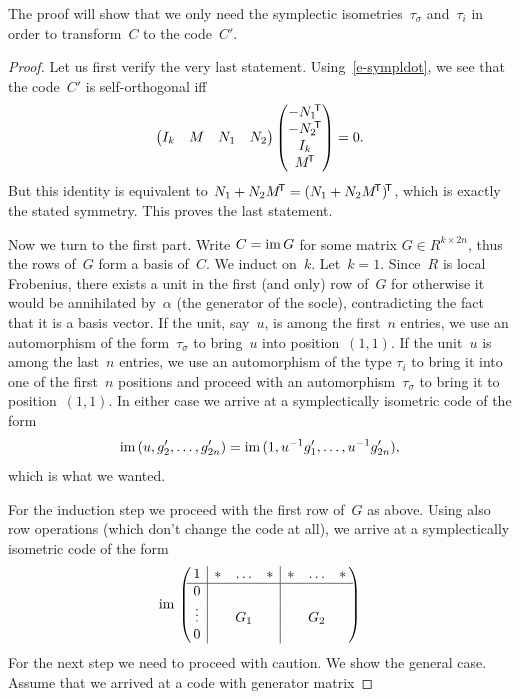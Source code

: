 \documentclass[11pt]{article}
\theoremstyle{definition}
\numberwithin{equation}{section}
\newcommand{\im}{\mbox{\rm im}\,}
\newcommand{\T}{\mbox{$\!^{\sf T}$}}
\newcounter{alp}
\begin{document}
The proof will show that we only need the symplectic isometries~$\tau_\sigma$ and~$\tau_i$ in order to transform~$C$ to the code~$C'$.

\begin{proof}
Let us first verify the very last statement.
Using~\eqref{e-sympldot}, we see that the code~$C'$ is self-orthogonal iff
\[
  \begin{pmatrix}I_k&M&N_1&N_2\end{pmatrix}\begin{pmatrix}-N_1\T\\-N_2\T\\I_k\\M\T\end{pmatrix}=0.
\]
But this identity is equivalent to $N_1+N_2M\T=(N_1+N_2M\T)\T$, which is exactly the stated symmetry.
This proves the last statement.

Now we turn to the first part.
Write $C=\im G$ for some matrix $G\in R^{k\times2n}$, thus the rows of~$G$ form a basis of~$C$.
We induct on~$k$.
Let~$k=1$.
Since~$R$ is local Frobenius, there exists a unit in the first (and only) row of~$G$
for otherwise it would be annihilated by~$\alpha$ (the generator of the socle),  contradicting the fact that it is a basis vector.
If the unit, say~$u$, is among the first~$n$ entries, we use an automorphism of the form~$\tau_\sigma$ to bring~$u$
into position~$(1,1)$.
If the unit~$u$ is among the last~$n$ entries, we use an automorphism of the type $\tau_i$ to bring it into one of
the first~$n$ positions and proceed with an automorphism~$\tau_\sigma$ to bring it to position~$(1,1)$.
In either case we arrive at a symplectically isometric code of the form
\[
  \im(u,g'_2,\ldots,g'_{2n})=\im(1,u^{-1}g'_1,\ldots,u^{-1}g'_{2n}),
\]
which is what we wanted.

For the induction step we proceed with the first row of~$G$ as above.
Using also row operations (which don't change the code at all),
we arrive at a symplectically isometric code of the form
\[
    \im\left(\!\!\begin{array}{c|ccc|ccc}
      1&*&\ldots&*&*&\ldots&*\\ \hline 0& & & & & & \\
      \vdots& &G_1& & &G_2&\\0& & & & & &\end{array}\!\!\right)
\]
For the next step we need to proceed with caution. We show the general case.
Assume that we arrived at a code with generator matrix


\end{proof}
\end{document}
